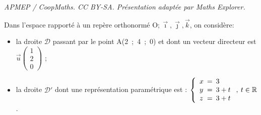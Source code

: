 \documentclass[10pt]{article}
\providecommand{\R}{\mathbb{R}}
\providecommand{\vect}[1]{\overrightarrow{#1}}
\providecommand{\Oijk}{\(\mathrm{O};\vec{\imath},\vec{\jmath},\vec{k}\)}
\begin{document}
\noindent\textit{APMEP / CoopMaths. CC BY-SA. Présentation adaptée par Maths Explorer.}\par\medskip
\medskip

Dans l'espace rapporté à un repère orthonormé \Oijk, on considère:

\begin{itemize}
\item[$\bullet~~$] la droite $\mathcal{D}$ passant par le point A(2~;~4~;~0) et dont un vecteur directeur est $\vect{u}\begin{pmatrix}1\\2\\0\end{pmatrix}$ ;
\item[$\bullet~~$] la droite $\mathcal{D}'$ dont une représentation paramétrique est : $\left\{\begin{array}{l !{=} l}
x&3\\
y& 3 + t\\
z&3 + t
\end{array}\right. ,\: t \in \R$.
\end{itemize}
\end{document}
